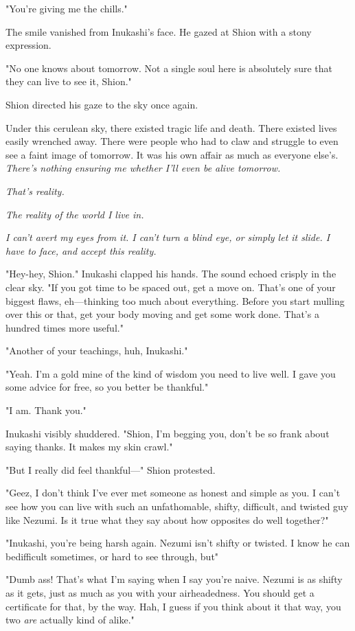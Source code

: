 "You're giving me the chills."

The smile vanished from Inukashi's face. He gazed at Shion with a stony
expression.

"No one knows about tomorrow. Not a single soul here is absolutely sure
that they can live to see it, Shion."

Shion directed his gaze to the sky once again.

Under this cerulean sky, there existed tragic life and death. There
existed lives easily wrenched away. There were people who had to claw
and struggle to even see a faint image of tomorrow. It was his own
affair as much as everyone else's. \emph{There's nothing ensuring me whether
I'll even be alive tomorrow.}

\emph{That's reality.}

\emph{The reality of the world I live in.}

\emph{I can't avert my eyes from it. I can't turn a blind eye, or simply let
it slide. I have to face, and accept this reality.}

"Hey-hey, Shion." Inukashi clapped his hands. The sound echoed crisply
in the clear sky. "If you got time to be spaced out, get a move on.
That's one of your biggest flaws, eh---thinking too much about everything.
Before you start mulling over this or that, get your body moving and get
some work done. That's a hundred times more useful."

"Another of your teachings, huh, Inukashi."

"Yeah. I'm a gold mine of the kind of wisdom you need to live well. I
gave you some advice for free, so you better be thankful."

"I am. Thank you."

Inukashi visibly shuddered. "Shion, I'm begging you, don't be so frank
about saying thanks. It makes my skin crawl."

"But I really did feel thankful---" Shion protested.

"Geez, I don't think I've ever met someone as honest and simple as you.
I can't see how you can live with such an unfathomable, shifty,
difficult, and twisted guy like Nezumi. Is it true what they say about
how opposites do well together?"

"Inukashi, you're being harsh again. Nezumi isn't shifty or twisted. I
know he can be\el difficult sometimes, or hard to see through, but\el "

"Dumb ass! That's what I'm saying when I say you're naive. Nezumi is as
shifty as it gets, just as much as you with your airheadedness. You
should get a certificate for that, by the way. Hah, I guess if you think
about it that way, you two \emph{are} actually kind of alike."

